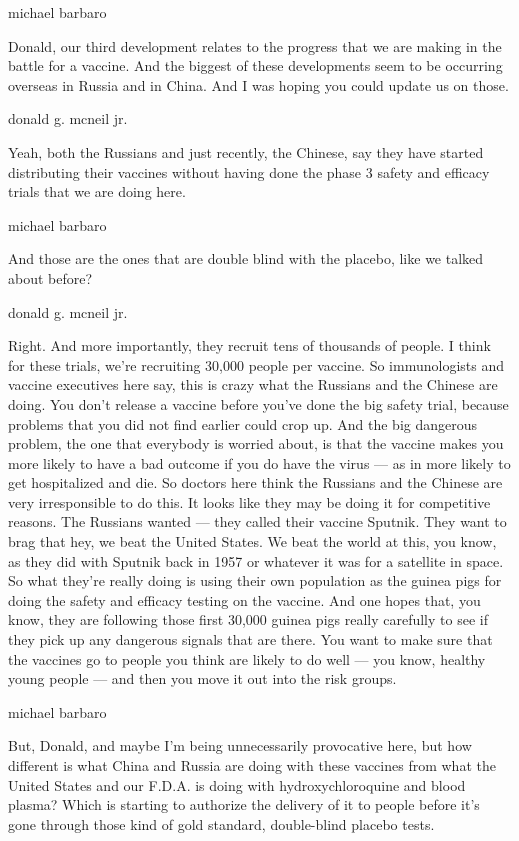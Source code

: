 michael barbaro

Donald, our third development relates to the progress that we are making
in the battle for a vaccine. And the biggest of these developments seem
to be occurring overseas in Russia and in China. And I was hoping you
could update us on those.

donald g. mcneil jr.

Yeah, both the Russians and just recently, the Chinese, say they have
started distributing their vaccines without having done the phase 3
safety and efficacy trials that we are doing here.

michael barbaro

And those are the ones that are double blind with the placebo, like we
talked about before?

donald g. mcneil jr.

Right. And more importantly, they recruit tens of thousands of people. I
think for these trials, we're recruiting 30,000 people per vaccine. So
immunologists and vaccine executives here say, this is crazy what the
Russians and the Chinese are doing. You don't release a vaccine before
you've done the big safety trial, because problems that you did not find
earlier could crop up. And the big dangerous problem, the one that
everybody is worried about, is that the vaccine makes you more likely to
have a bad outcome if you do have the virus --- as in more likely to get
hospitalized and die. So doctors here think the Russians and the Chinese
are very irresponsible to do this. It looks like they may be doing it
for competitive reasons. The Russians wanted --- they called their
vaccine Sputnik. They want to brag that hey, we beat the United States.
We beat the world at this, you know, as they did with Sputnik back in
1957 or whatever it was for a satellite in space. So what they're really
doing is using their own population as the guinea pigs for doing the
safety and efficacy testing on the vaccine. And one hopes that, you
know, they are following those first 30,000 guinea pigs really carefully
to see if they pick up any dangerous signals that are there. You want to
make sure that the vaccines go to people you think are likely to do well
--- you know, healthy young people --- and then you move it out into the
risk groups.

michael barbaro

But, Donald, and maybe I'm being unnecessarily provocative here, but how
different is what China and Russia are doing with these vaccines from
what the United States and our F.D.A. is doing with hydroxychloroquine
and blood plasma? Which is starting to authorize the delivery of it to
people before it's gone through those kind of gold standard,
double-blind placebo tests.

